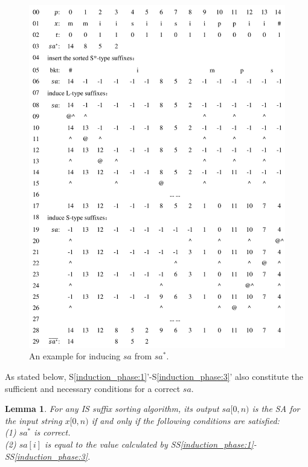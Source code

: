 \documentclass[10pt,journal,compsoc]{IEEEtran}
\newtheorem{lemma}[theorem]{Lemma}
\begin{document}
\begin{figure}[t]
	\centering
	
	\includegraphics[width = 1\columnwidth]{example.pdf}
	
	\caption{An example for inducing $sa$ from $sa^*$.}
	
	\label{fig:example1}
	
\end{figure}

As stated below, S\ref{induction_phase:1}'-S\ref{induction_phase:3}' also constitute the sufficient and necessary conditions for a correct $sa$.

\begin{lemma} \label{lemma:3}
	For any IS suffix sorting algorithm, its output $sa[0, n)$ is the SA for the input string $x[0, n)$ if and only if the following conditions are satisfied: \\ 
	(1) $sa^*$ is correct. \\
	(2) $sa[i]$ is equal to the value calculated by SS\ref{induction_phase:1}-SS\ref{induction_phase:3}. \\
	
\end{lemma}
\end{document}

